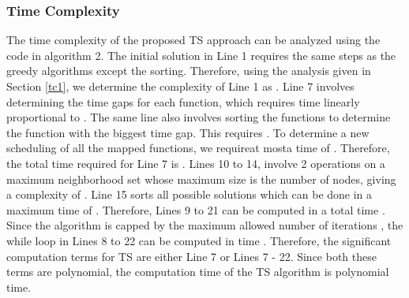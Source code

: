 \documentclass[conference]{IEEEtran}
\begin{document}
\subsubsection{Time Complexity}
The time complexity of the proposed TS approach can be analyzed using the code in algorithm 2. The initial solution in Line 1 requires the same steps as the greedy algorithms except the sorting. Therefore, using the analysis given in Section \ref{tc1}, we determine the complexity of Line 1 as . Line 7 involves determining the time gaps for each function, which requires time linearly proportional to . The same line also involves sorting the functions to determine the function with the biggest time gap. This requires . To determine a new scheduling of all the mapped functions, we requireat mosta time of . Therefore, the total time required for Line 7 is . Lines 10 to 14, involve 2 operations on a maximum neighborhood set whose maximum size is the number of nodes, giving a complexity of . Line 15 sorts all possible solutions which can be done in a maximum time of . Therefore, Lines 9 to 21 can be computed in a total time . Since the algorithm is capped by the maximum allowed number of iterations , the while loop in Lines 8 to 22 can be computed in time . Therefore, the significant computation terms for TS are either Line 7 or Lines 7 - 22. Since both these terms are polynomial, the computation time of the TS algorithm is polynomial time.

\begin{table*}[htb]
\begin{minipage}{1\textwidth}
\caption {Definition of Parameters and Variables for the \ac{MILP} Formulation}
\renewcommand{\arraystretch}{1.7}
\small
\centering
{}
\label{variabley}
\end{minipage}
\end{table*}
\end{document}
